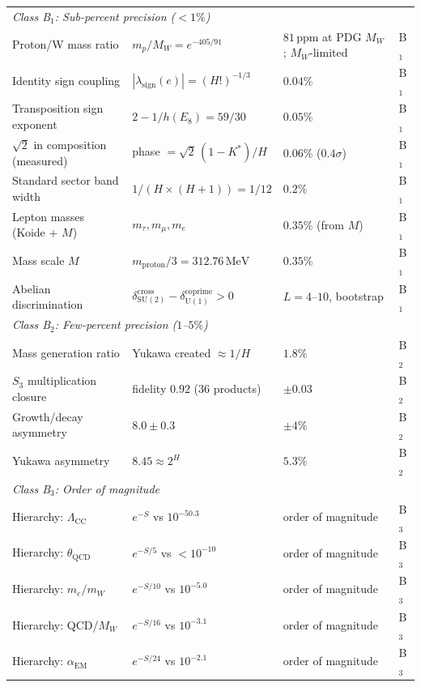 \documentclass[11pt,a4paper]{article}
\theoremstyle{definition}
\theoremstyle{remark}
\newcommand{\SU}{\mathrm{SU}}
\begin{document}
\begin{center}
\begin{tabular}{llll}
\midrule
\multicolumn{4}{l}{\textit{Class B$_1$: Sub-percent precision ($<1\%$)}} \\[3pt]
Proton/W mass ratio & $m_p/M_W = e^{-405/91}$ & $81\,\mathrm{ppm}$ at PDG $M_W$; $M_W$-limited & B$_1$ \\
Identity sign coupling & $|\lambda_{\mathrm{sign}}(e)| = (H!)^{-1/3}$ & $0.04\%$ & B$_1$ \\
Transposition sign exponent & $2 - 1/h(E_8) = 59/30$ & $0.05\%$ & B$_1$ \\
$\sqrt{2}$ in composition (measured) & phase $= \sqrt{2}\,(1-K^*)/H$ & $0.06\%$ ($0.4\sigma$) & B$_1$ \\
Standard sector band width & $1/(H \times (H+1)) = 1/12$ & $0.2\%$ & B$_1$ \\
Lepton masses (Koide + $M$) & $m_\tau, m_\mu, m_e$ & $0.35\%$ (from $M$) & B$_1$ \\
Mass scale $M$ & $m_{\mathrm{proton}}/3 = 312.76\,\mathrm{MeV}$ & $0.35\%$ & B$_1$ \\
Abelian discrimination & $\delta_{\SU(2)}^{\mathrm{cross}} - \delta_{\mathrm{U}(1)}^{\mathrm{coprime}} > 0$ & $L\!=\!4$--$10$, bootstrap & B$_1$ \\
\midrule
\multicolumn{4}{l}{\textit{Class B$_2$: Few-percent precision ($1$--$5\%$)}} \\[3pt]
Mass generation ratio & Yukawa created $\approx 1/H$ & $1.8\%$ & B$_2$ \\
$S_3$ multiplication closure & fidelity $0.92$ (36 products) & $\pm 0.03$ & B$_2$ \\
Growth/decay asymmetry & $8.0 \pm 0.3$ & $\pm 4\%$ & B$_2$ \\
Yukawa asymmetry & $8.45 \approx 2^H$ & $5.3\%$ & B$_2$ \\
\midrule
\multicolumn{4}{l}{\textit{Class B$_3$: Order of magnitude}} \\[3pt]
Hierarchy: $\Lambda_{\mathrm{CC}}$ & $e^{-S}$ vs $10^{-50.3}$ & order of magnitude & B$_3$ \\
Hierarchy: $\theta_{\mathrm{QCD}}$ & $e^{-S/5}$ vs $< 10^{-10}$ & order of magnitude & B$_3$ \\
Hierarchy: $m_e/m_W$ & $e^{-S/10}$ vs $10^{-5.0}$ & order of magnitude & B$_3$ \\
Hierarchy: QCD/$M_W$ & $e^{-S/16}$ vs $10^{-3.1}$ & order of magnitude & B$_3$ \\
Hierarchy: $\alpha_{\mathrm{EM}}$ & $e^{-S/24}$ vs $10^{-2.1}$ & order of magnitude & B$_3$ \\
\bottomrule
\end{tabular}
\end{center}
\end{document}
